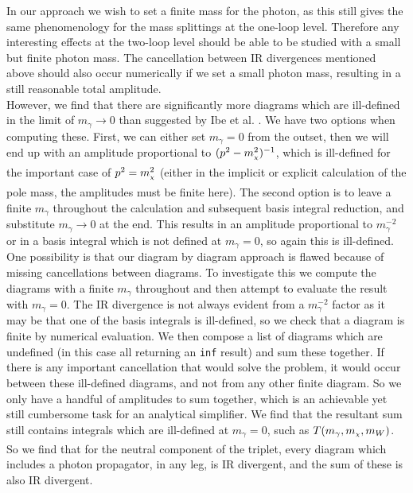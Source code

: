 \documentclass[11pt]{article}
\newcommand{\mychi}{\raisebox{0pt}[1ex][1ex]{\tiny$\chi$}}
\def\mc{m_{\mychi}}
\begin{document}
In our approach we wish to set a finite mass for the photon, as this still gives the same phenomenology for the mass splittings at the one-loop level.  Therefore any interesting effects at the two-loop level should be able to be studied with a small but finite photon mass.  The cancellation between IR divergences mentioned above should also occur numerically if we set a small photon mass, resulting in a still reasonable total amplitude.\\

However, we find that there are significantly more diagrams which are ill-defined in the limit of $m_{\gamma}\rightarrow 0$ than suggested by Ibe et al. \cite{Ibe2013a}.  We have two options when computing these.  First, we can either set $m_{\gamma}=0$ from the outset, then we will end up with an amplitude proportional to $(p^2-\mc^2)^{-1}$, which is ill-defined for the important case of $p^2=\mc^2$ (either in the implicit or explicit calculation of the pole mass, the amplitudes must be finite here).  The second option is to leave a finite $m_{\gamma}$ throughout the calculation and subsequent basis integral reduction, and substitute $m_{\gamma}\rightarrow 0$ at the end.  This results in an amplitude proportional to $m_{\gamma}^{-2}$ or in a basis integral which is not defined at $m_{\gamma}=0$, so again this is ill-defined.\\

One possibility is that our diagram by diagram approach is flawed because of missing cancellations between diagrams.  To investigate this we compute the diagrams with a finite $m_{\gamma}$ throughout and then attempt to evaluate the result with $m_{\gamma}=0$.  The IR divergence is not always evident from a $m_{\gamma}^{-2}$ factor as it may be that one of the basis integrals is ill-defined, so we check that a diagram is finite by numerical evaluation.  We then compose a list of diagrams which are undefined (in this case all returning an \lstinline{inf} result) and sum these together.  If there is any important cancellation that would solve the problem, it would occur between these ill-defined diagrams, and not from any other finite diagram.  So we only have a handful of amplitudes to sum together, which is an achievable yet still cumbersome task for an analytical simplifier.  We find that the resultant sum still contains integrals which are ill-defined at $m_{\gamma}=0$, such as $T(m_{\gamma},\mc,m_W)$.\\

So we find that for the neutral component of the triplet, every diagram which includes a photon propagator, in any leg, is IR divergent, and the sum of these is also IR divergent.
\end{document}
